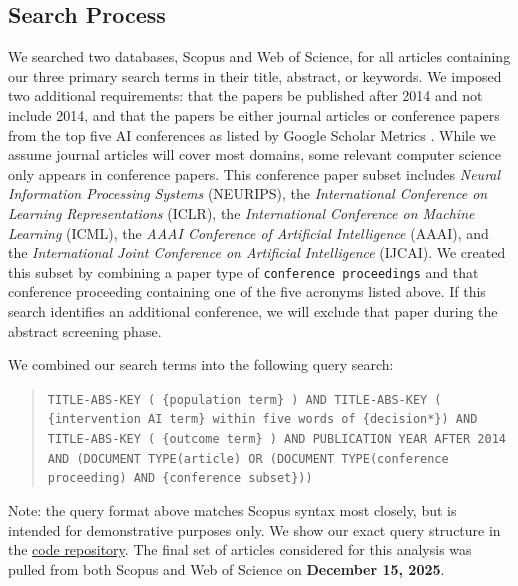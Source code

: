 \documentclass[authoryear,preprint,12pt]{elsarticle}
\begin{document}
\begin{table}[ht]
\centering
\caption{Search terms used to produce Cartesian-product-based queries}
\label{tab:search_terms}
\renewcommand{\arraystretch}{1.25}

\end{table}

\FloatBarrier

\subsection{Search Process}
We searched two databases, Scopus and Web of Science, for all articles
containing our three primary search terms in their title, abstract, or keywords.
We imposed two additional requirements: that the papers be published after 2014
and not include 2014, and that the papers be either journal articles or
conference papers from the top five AI conferences as listed by Google Scholar
Metrics \cite{google_scholar_metrics}. While we assume journal articles will
cover most domains, some relevant computer science only appears in conference
papers. This conference paper subset includes \textit{Neural Information
Processing Systems} (NEURIPS), the \textit{International Conference on Learning
Representations} (ICLR), the \textit{International Conference on Machine
Learning} (ICML), the \textit{AAAI Conference of Artificial Intelligence}
(AAAI), and the \textit{International Joint Conference on Artificial
Intelligence} (IJCAI). We created this subset by combining a paper type of
\texttt{conference proceedings} and that conference proceeding containing one of
the five acronyms listed above. If this search identifies an additional
conference, we will exclude that paper during the abstract screening phase. 

We combined our search terms into the following query search:
\begin{quote}
\texttt{TITLE-ABS-KEY ( \{population term\} ) AND TITLE-ABS-KEY ( \{intervention
AI term\} within five words of \{decision*\}) AND TITLE-ABS-KEY ( \{outcome
term\} ) AND PUBLICATION YEAR AFTER 2014 AND (DOCUMENT TYPE(article) OR
(DOCUMENT TYPE(conference proceeding) AND \{conference subset\}))}
\end{quote}

Note: the query format above matches Scopus syntax most closely, but is intended
for demonstrative purposes only. We show our exact query structure in the
\href{https://github.com/aims-umich/2025-panczyk-slr}{code repository}. The
final set of articles considered for this analysis was pulled from both Scopus
and Web of Science on \textbf{December 15, 2025}.
\end{document}
